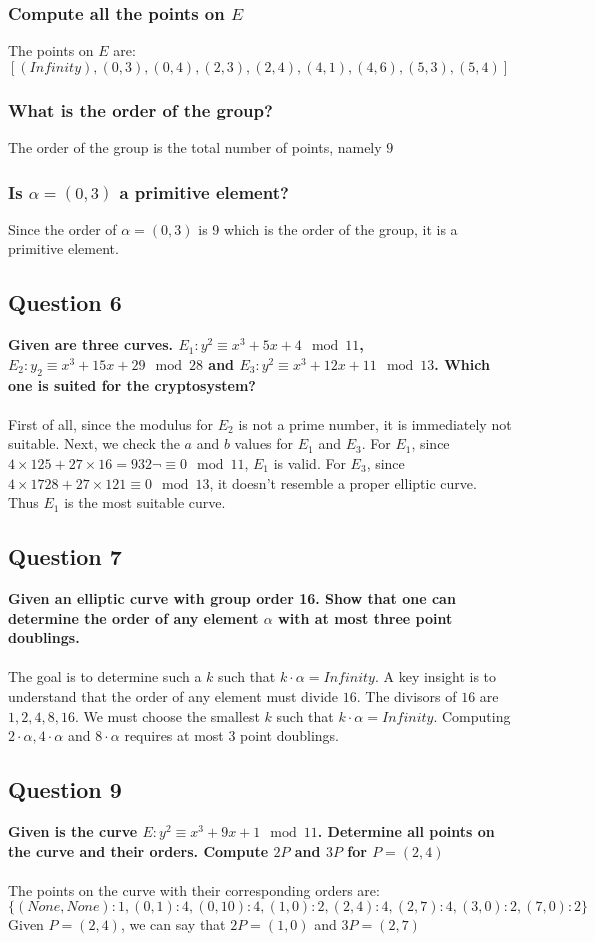 \documentclass[titlepage]{article}
\begin{document}
{{\subsubsection{Compute all the points on \(E\)}
{
The points on \(E\) are: \([(Infinity), (0, 3), (0, 4), (2, 3), (2, 4), (4, 1), (4, 6), (5, 3), (5, 4)]\)
}
\subsubsection{What is the order of the group?}
{
The order of the group is the total number of points, namely \(9\)
}
\subsubsection{Is \(\alpha = (0,3)\) a primitive element?}
{
Since the order of \(\alpha = (0, 3)\) is 9 which is the order of the group, it is a primitive element.
}
}
\subsection{Question 6}
{
\textbf{Given are three curves. \(E_1 : y^2 \equiv x^3 + 5x + 4 \mod 11\), \(E_2 : y_2 \equiv x^3 + 15x + 29 \mod 28\) and \(E_3: y^2 \equiv x^3 + 12x + 11 \mod 13\). Which one is suited for the cryptosystem?}\\\\
First of all, since the modulus for \(E_2\) is not a prime number, it is immediately not suitable. Next, we check the \(a\) and \(b\) values for \(E_1\) and \(E_3\). For \(E_1\), since \(4 \times 125 + 27 \times 16 = 932 \lnot \equiv 0 \mod 11\), \(E_1\) is valid. For \(E_3\), since \(4 \times 1728 + 27 \times 121 \equiv 0 \mod 13\), it doesn't resemble a proper elliptic curve. Thus \(E_1\) is the most suitable curve.
}
\subsection{Question 7}
{
\textbf{Given an elliptic curve with group order 16. Show that one can determine the order of any element \(\alpha\) with at most three point doublings.}\\\\
The goal is to determine such a \(k\) such that \(k \cdot \alpha = Infinity\). A key insight is to understand that the order of any element must divide \(16\). The divisors of \(16\) are \(1, 2, 4, 8, 16\). We must choose the smallest \(k\) such that \(k \cdot \alpha = Infinity\). Computing \(2 \cdot \alpha, 4 \cdot \alpha\) and \(8 \cdot \alpha\) requires at most 3 point doublings. 
}
\subsection{Question 9}
{
\textbf{Given is the curve \(E : y^2 \equiv x^3 + 9x + 1 \mod 11\). Determine all points on the curve and their orders. Compute \(2P\) and \(3P\) for \(P = (2,4)\)}\\\\
The points on the curve with their corresponding orders are: \(\{(None, None): 1, (0, 1): 4, (0, 10): 4, (1, 0): 2, (2, 4): 4, (2, 7): 4, (3, 0): 2, (7, 0): 2\}\)\\Given \(P = (2, 4)\), we can say that \(2P = (1,0)\) and \(3P = (2,7)\)
}
}
\clearpage
\end{document}
